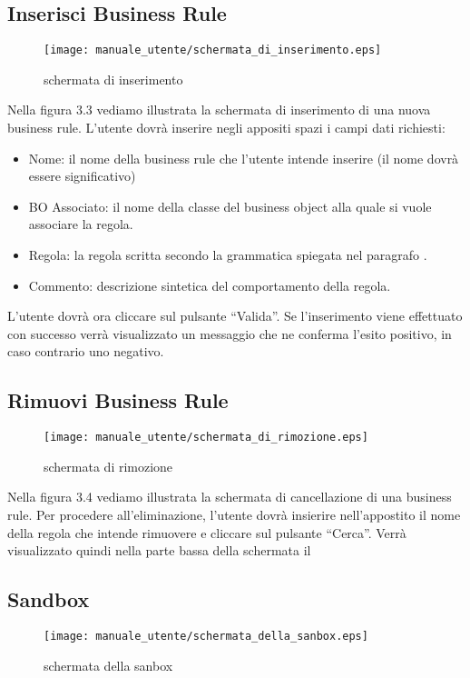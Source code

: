 \subsection{Inserisci Business Rule}
\begin{figure}[htbp]
\begin{center}
\texttt{[image: manuale\_utente/schermata\_di\_inserimento.eps]}
\end{center}
\caption{schermata di inserimento}
\label{figura 3.3}
\end{figure}
Nella figura 3.3 vediamo illustrata la schermata di inserimento di una nuova business rule. L'utente dovr\`a inserire negli appositi spazi i campi dati richiesti:
\begin{itemize}
\item Nome: il nome della business rule che l'utente intende inserire (il nome dovr\`a essere significativo)
\item BO Associato: il nome della classe del business object alla quale si vuole associare la regola.
\item Regola: la regola scritta secondo la grammatica spiegata nel paragrafo \Grammatica.
\item Commento: descrizione sintetica del comportamento della regola. 
\end{itemize}
L'utente dovr\`a ora cliccare sul pulsante ``Valida''. Se l'inserimento viene effettuato con successo verr\`a visualizzato un messaggio che ne conferma l'esito positivo, in caso contrario uno negativo.
\subsection{Rimuovi Business Rule}
\begin{figure}[htbp]
\begin{center}
\texttt{[image: manuale\_utente/schermata\_di\_rimozione.eps]}
\end{center}
\caption{schermata di rimozione}
\label{figura 3.4}
\end{figure}
Nella figura 3.4 vediamo illustrata la schermata di cancellazione di una business rule. Per procedere all'eliminazione, l'utente dovr\`a insierire nell'appostito  il nome della regola che intende rimuovere e cliccare sul pulsante ``Cerca''. Verr\`a visualizzato quindi nella parte bassa della schermata il 

\subsection{Sandbox}
\begin{figure}[htbp]
\begin{center}
\texttt{[image: manuale\_utente/schermata\_della\_sanbox.eps]}
\end{center}
\caption{schermata della sanbox}
\label{figura 3.5}
\end{figure}
